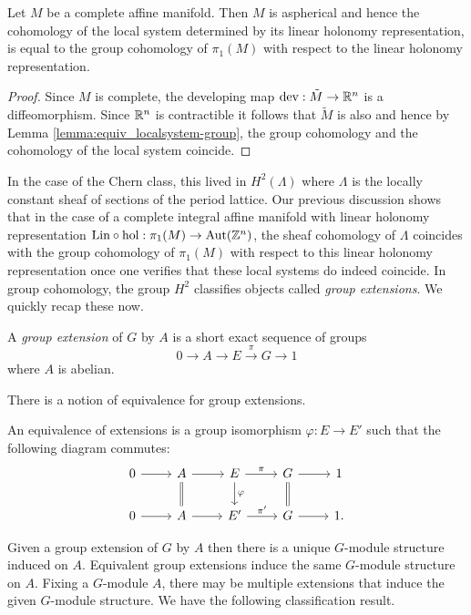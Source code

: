 \begin{lemma}
    Let $M$ be a complete affine manifold. Then $M$ is aspherical and hence the cohomology of the local system determined by
    its linear holonomy representation, is equal to the group cohomology of $\pi_1(M)$ with respect to the linear holonomy representation.
\end{lemma}

\begin{proof}
    Since $M$ is complete, the developing map $\text{dev}: \tilde{M} \to \mathbb{R}^n$ is a diffeomorphism. Since $\mathbb{R}^n$ is contractible it follows that $\tilde{M}$ is also and hence by
    Lemma \ref{lemma:equiv_localsystem-group}, the group cohomology and the cohomology of the local system coincide.
\end{proof}

In the case of the Chern class, this lived in $H^2(\Lambda)$ where $\Lambda$ is
the locally constant sheaf of sections of the period lattice. Our previous
discussion shows that in the case of a complete integral affine manifold with
linear holonomy representation $\text{Lin}\circ \text{hol}: \pi_1(M) \to
    \text{Aut}(\mathbb{Z}^n) $, the sheaf cohomology of $\Lambda$ coincides with the group
cohomology of $\pi_1(M)$ with respect to this linear holonomy representation
once one verifies that these local systems do indeed coincide. In group
cohomology, the group $H^2$ classifies objects called \emph{group extensions}.
We quickly recap these now.

\begin{definition}
    A \emph{group extension} of $G$ by $A$ is a short exact sequence of groups
    $$
        0 \to A \to E \xrightarrow{\pi} G \to 1
    $$
    where $A$ is abelian.
\end{definition}

There is a notion of equivalence for group extensions.
\begin{definition}
    An equivalence of extensions is a group
    isomorphism $\varphi : E \to E'$ such that the following diagram commutes:
    \[
        \begin{tikzcd}
            0 \arrow[r] & A \arrow[r] \arrow[d, equal] & E \arrow[r, "\pi"] \arrow[d, "\varphi"] & G \arrow[r] \arrow[d, equal] & 1 \\
            0 \arrow[r] & A\arrow[r] & E' \arrow[r, "\pi'"] & G \arrow[r] & 1.
        \end{tikzcd}
    \]
\end{definition}

Given a group extension of $G$ by $A$ then there is a unique $G$-module
structure induced on $A$. Equivalent group extensions induce the same
$G$-module structure on $A$. Fixing a $G$-module $A$, there may be multiple
extensions that induce the given $G$-module structure. We have the following
classification result.

